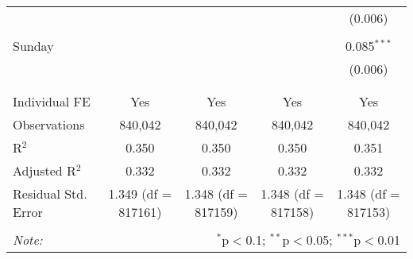 \documentclass[
]{article}
\begin{document}
\begin{table}[!htbp]
{\begin{tabular}{@{\extracolsep{5pt}}lcccc}
  &  &  &  & (0.006) \\ 
  & & & & \\ 
 Sunday &  &  &  & 0.085$^{***}$ \\ 
  &  &  &  & (0.006) \\ 
  & & & & \\ 
\hline \\[-1.8ex] 
Individual FE & Yes & Yes & Yes & Yes \\ 
Observations & 840,042 & 840,042 & 840,042 & 840,042 \\ 
R$^{2}$ & 0.350 & 0.350 & 0.350 & 0.351 \\ 
Adjusted R$^{2}$ & 0.332 & 0.332 & 0.332 & 0.332 \\ 
Residual Std. Error & 1.349 (df = 817161) & 1.348 (df = 817159) & 1.348 (df = 817158) & 1.348 (df = 817153) \\ 
\hline 
\hline \\[-1.8ex] 
\textit{Note:}  & \multicolumn{4}{r}{$^{*}$p$<$0.1; $^{**}$p$<$0.05; $^{***}$p$<$0.01} \\ 
\end{tabular}
} 
\end{table} 
\newpage
\end{document}
